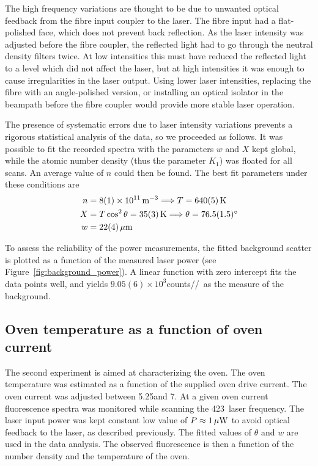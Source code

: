 The high frequency variations are thought to be due to unwanted optical feedback from the fibre input coupler to the laser. The fibre input had a flat-polished face, which does not prevent back reflection. As the laser intensity was adjusted before the fibre coupler, the reflected light had to go through the neutral density filters twice. At low intensities this must have reduced the reflected light to a level which did not affect the laser, but at high intensities it was enough to cause irregularities in the laser output. Using lower laser intensities, replacing the fibre with an angle-polished version, or installing an optical isolator in the beampath before the fibre coupler would provide more stable laser operation. 

The presence of systematic errors due to laser intensity variations prevents a rigorous statistical analysis of the data, so we proceeded as follows. It was possible to fit the recorded spectra with the parameters $w$ and $X$ kept global, while the atomic number density (thus the parameter $K_1$) was floated for all scans. An average value of $n$ could then be found. The best fit parameters under these conditions are
\begin{align}
n & = 8(1) \times 10^{11} \,\mbox{m}^{-3} \Longrightarrow T = 640(5) \,\mbox{K} \\
X & = T \cos^2 \theta = 35 (3) \,\mbox{K} \Longrightarrow  \theta = 76.5(1.5)\mbox{$^{\circ}$} \\
w & = 22 (4) \,\mbox{$\mu$m}
\end{align}

To assess the reliability of the power measurements, the fitted background scatter is plotted as a function of the measured laser power (see Figure~\ref{fig:background_power}). A linear function with zero intercept fits the data points well, and yields $9.05(6)\times10^{3}$counts/\s/\uW\, as the measure of the background. 



\subsection{Oven temperature as a function of oven current}
\label{subsec:tempovenfluo}

The second experiment is aimed at characterizing the \CaI{} oven. The oven temperature was estimated as a function of the supplied oven drive current. The oven current was adjusted between 5.25\A and 7\A. At a given oven current fluorescence spectra was monitored while scanning the 423\nm\, laser frequency. The laser input power was kept constant low value of $P\approx1\,\mbox{$\mu$W}$ to avoid optical feedback to the laser, as described previously. The fitted values of $\theta$ and $w$ are used in the data analysis. The observed fluorescence is then a function of the number density and the temperature of the \CaI{} oven.


